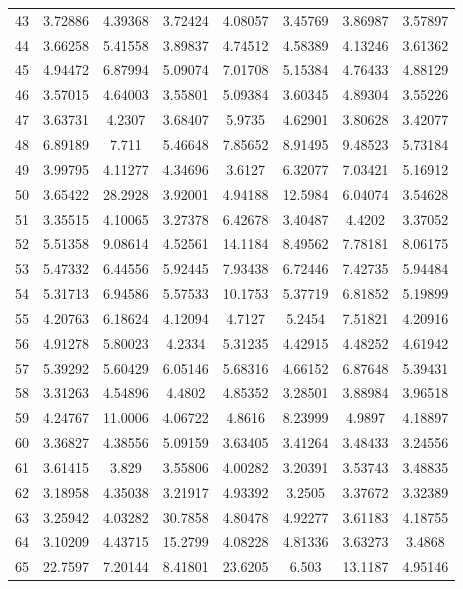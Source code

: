 \begin{figure}
\begin{tabular}{cccccccc}
43 & 3.72886 & 4.39368 & 3.72424 & 4.08057 & 3.45769 & 3.86987 & 3.57897\\
44 & 3.66258 & 5.41558 & 3.89837 & 4.74512 & 4.58389 & 4.13246 & 3.61362\\
45 & 4.94472 & 6.87994 & 5.09074 & 7.01708 & 5.15384 & 4.76433 & 4.88129\\
46 & 3.57015 & 4.64003 & 3.55801 & 5.09384 & 3.60345 & 4.89304 & 3.55226\\
47 & 3.63731 & 4.2307 & 3.68407 & 5.9735 & 4.62901 & 3.80628 & 3.42077\\
48 & 6.89189 & 7.711 & 5.46648 & 7.85652 & 8.91495 & 9.48523 & 5.73184\\
49 & 3.99795 & 4.11277 & 4.34696 & 3.6127 & 6.32077 & 7.03421 & 5.16912\\
50 & 3.65422 & 28.2928 & 3.92001 & 4.94188 & 12.5984 & 6.04074 & 3.54628\\
51 & 3.35515 & 4.10065 & 3.27378 & 6.42678 & 3.40487 & 4.4202 & 3.37052\\
52 & 5.51358 & 9.08614 & 4.52561 & 14.1184 & 8.49562 & 7.78181 & 8.06175\\
53 & 5.47332 & 6.44556 & 5.92445 & 7.93438 & 6.72446 & 7.42735 & 5.94484\\
54 & 5.31713 & 6.94586 & 5.57533 & 10.1753 & 5.37719 & 6.81852 & 5.19899\\
55 & 4.20763 & 6.18624 & 4.12094 & 4.7127 & 5.2454 & 7.51821 & 4.20916\\
56 & 4.91278 & 5.80023 & 4.2334 & 5.31235 & 4.42915 & 4.48252 & 4.61942\\
57 & 5.39292 & 5.60429 & 6.05146 & 5.68316 & 4.66152 & 6.87648 & 5.39431\\
58 & 3.31263 & 4.54896 & 4.4802 & 4.85352 & 3.28501 & 3.88984 & 3.96518\\
59 & 4.24767 & 11.0006 & 4.06722 & 4.8616 & 8.23999 & 4.9897 & 4.18897\\
60 & 3.36827 & 4.38556 & 5.09159 & 3.63405 & 3.41264 & 3.48433 & 3.24556\\
61 & 3.61415 & 3.829 & 3.55806 & 4.00282 & 3.20391 & 3.53743 & 3.48835\\
62 & 3.18958 & 4.35038 & 3.21917 & 4.93392 & 3.2505 & 3.37672 & 3.32389\\
63 & 3.25942 & 4.03282 & 30.7858 & 4.80478 & 4.92277 & 3.61183 & 4.18755\\
64 & 3.10209 & 4.43715 & 15.2799 & 4.08228 & 4.81336 & 3.63273 & 3.4868\\
65 & 22.7597 & 7.20144 & 8.41801 & 23.6205 & 6.503 & 13.1187 & 4.95146\\

\end{tabular}
\end{figure}
